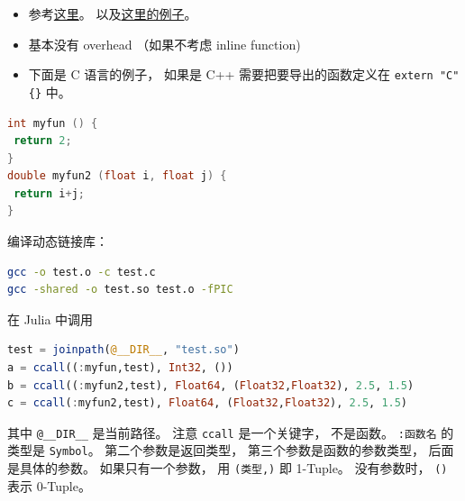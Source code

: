 
\begin{issues}
\issueDraft
\end{issues}

\begin{itemize}
\item 参考\href{https://docs.julialang.org/en/v1/manual/calling-c-and-fortran-code/}{这里}。 以及\href{https://discourse.julialang.org/t/how-to-make-julia-call-c-c-coded-function/54780/5}{这里的例子}。
\item 基本没有 overhead （如果不考虑 inline function)
\item 下面是 C 语言的例子， 如果是 C++ 需要把要导出的函数定义在 \verb`extern "C" {}` 中。
\end{itemize}

\begin{lstlisting}[language=cpp]
int myfun () {
 return 2;
}
double myfun2 (float i, float j) {
 return i+j;
}
\end{lstlisting}

编译动态链接库：
\begin{lstlisting}[language=bash]
gcc -o test.o -c test.c
gcc -shared -o test.so test.o -fPIC
\end{lstlisting}

在 Julia 中调用
\begin{lstlisting}[language=julia]
test = joinpath(@__DIR__, "test.so")
a = ccall((:myfun,test), Int32, ())
b = ccall((:myfun2,test), Float64, (Float32,Float32), 2.5, 1.5)
c = ccall(:myfun2,test), Float64, (Float32,Float32), 2.5, 1.5)
\end{lstlisting}
其中 \verb`@__DIR__` 是当前路径。 注意 \verb`ccall` 是一个关键字， 不是函数。 \verb`:函数名` 的类型是 \verb`Symbol`。 第二个参数是返回类型， 第三个参数是函数的参数类型， 后面是具体的参数。 如果只有一个参数， 用 \verb`(类型,)` 即 1-Tuple。 没有参数时， \verb`()` 表示 0-Tuple。
